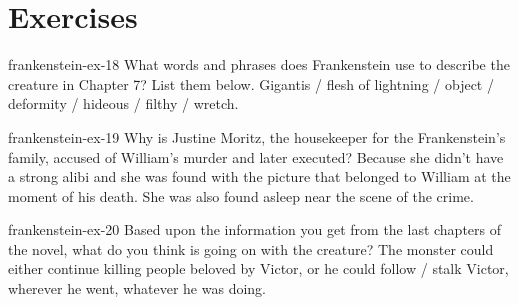 \documentclass[preview]{standalone}
\begin{document}
\genpage

\section{Exercises}

\begin{snippetexercise}{frankenstein-ex-18}
    { What words and phrases does Frankenstein use to describe the creature in Chapter 7? List them
    below.}
    Gigantis / flesh of lightning / object / deformity / hideous / filthy / wretch.
\end{snippetexercise}

\begin{snippetexercise}{frankenstein-ex-19}
    {Why is Justine Moritz, the housekeeper for the Frankenstein's family, accused
    of William's murder and later executed?}
    Because she didn't have a strong alibi  and she was found with the picture that belonged
    to William at the moment of his death. She was also found asleep near the scene
    of the crime.
\end{snippetexercise}

\begin{snippetexercise}{frankenstein-ex-20}
    {Based upon the information you get from the last chapters of the novel, what do you think is
    going on with the creature?}
    The monster could either continue killing people beloved by Victor, or
    he could follow / stalk Victor, wherever he went, whatever he was doing.
\end{snippetexercise}
\end{document}
